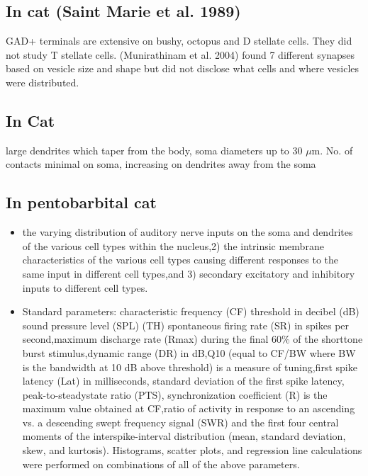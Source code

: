 \documentclass[10pt,a4paper]{article}
\newcommand{\um}{$\mu$m}
\begin{document}
\subsection{In cat (Saint Marie et al. 1989)}
 GAD+ terminals are extensive on bushy, octopus
and D stellate cells. They did not study T stellate cells.  (Munirathinam et
al. 2004) found 7 different synapses based on vesicle size and shape but did not
disclose what cells and where vesicles were distributed.

\subsection{In Cat \citep{Cant:1981}}
 large dendrites which taper from the body, soma
diameters up to 30 \um.  No. of contacts minimal on soma, increasing on dendrites
away from the soma

\subsection{In pentobarbital cat \citep{RhodeSmith:1986}}


\begin{itemize}
\item the varying distribution of auditory nerve inputs on the soma and
  dendrites of the various cell types within the nucleus,2) the intrinsic
  membrane characteristics of the various cell types causing different responses
  to the same input in different cell types,and 3) secondary excitatory and
  inhibitory inputs to different cell types.
\item Standard parameters: characteristic frequency (CF) threshold in decibel
  (dB) sound pressure level (SPL) (TH) spontaneous firing rate (SR) in spikes
  per second,maximum discharge rate (Rmax) during the final 60\% of the
  shorttone burst stimulus,dynamic range (DR) in dB,Q10 (equal to CF/BW where BW
  is the bandwidth at 10 dB above threshold) is a measure of tuning,first spike
  latency (Lat) in milliseconds, standard deviation of the first spike latency,
  peak-to-steadystate ratio (PTS), synchronization coefficient (R) is the
  maximum value obtained at CF,ratio of activity in response to an ascending
  vs. a descending swept frequency signal (SWR) and the first four central
  moments of the interspike-interval distribution (mean, standard deviation,
  skew, and kurtosis). Histograms, scatter plots, and regression line
  calculations were performed on combinations of all of the above parameters.
\end{itemize}
\end{document}

